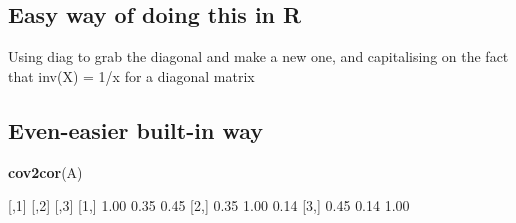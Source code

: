 \documentclass[11pt,]{article}
\newenvironment{Shaded}{\begin{snugshade}}{\end{snugshade}}
\newcommand{\KeywordTok}[1]{\textcolor[rgb]{0.13,0.29,0.53}{\textbf{#1}}}
\newcommand{\DecValTok}[1]{\textcolor[rgb]{0.00,0.00,0.81}{#1}}
\newcommand{\FloatTok}[1]{\textcolor[rgb]{0.00,0.00,0.81}{#1}}
\newcommand{\StringTok}[1]{\textcolor[rgb]{0.31,0.60,0.02}{#1}}
\newcommand{\CommentTok}[1]{\textcolor[rgb]{0.56,0.35,0.01}{\textit{#1}}}
\newcommand{\OperatorTok}[1]{\textcolor[rgb]{0.81,0.36,0.00}{\textbf{#1}}}
\newcommand{\NormalTok}[1]{#1}
\begin{document}
\subsection{Easy way of doing this in
R}\label{easy-way-of-doing-this-in-r}

Using diag to grab the diagonal and make a new one, and capitalising on
the fact that inv(X) = 1/x for a diagonal matrix

\begin{Shaded}
\end{Shaded}

\subsection{Even-easier built-in way}\label{even-easier-built-in-way}

\begin{Shaded}
\begin{Highlighting}[]
\KeywordTok{cov2cor}\NormalTok{(A)}

\NormalTok{     [,}\DecValTok{1}\NormalTok{] [,}\DecValTok{2}\NormalTok{] [,}\DecValTok{3}\NormalTok{]}
\NormalTok{[}\DecValTok{1}\NormalTok{,] }\FloatTok{1.00} \FloatTok{0.35} \FloatTok{0.45}
\NormalTok{[}\DecValTok{2}\NormalTok{,] }\FloatTok{0.35} \FloatTok{1.00} \FloatTok{0.14}
\NormalTok{[}\DecValTok{3}\NormalTok{,] }\FloatTok{0.45} \FloatTok{0.14} \FloatTok{1.00}
\end{Highlighting}
\end{Shaded}




\newpage
\singlespacing 
\end{document}
